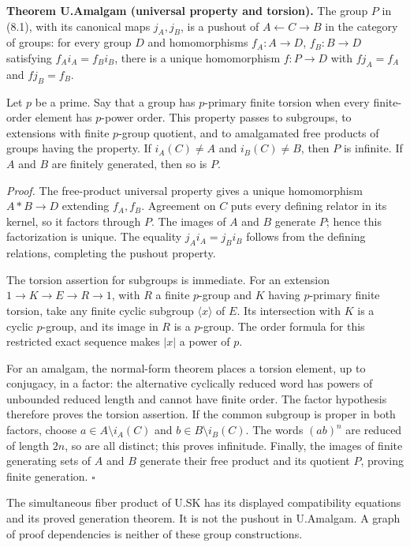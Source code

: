 \documentclass[
  11pt,
  a4paper,
]{article}
\begin{document}
\textbf{Theorem U.Amalgam (universal property and torsion).} The group
\(P\) in (8.1), with its canonical maps \(j_A,j_B\), is a pushout of
\(A\leftarrow C\to B\) in the category of groups: for every group \(D\)
and homomorphisms \(f_A:A\to D\), \(f_B:B\to D\) satisfying
\(f_Ai_A=f_Bi_B\), there is a unique homomorphism \(f:P\to D\) with
\(fj_A=f_A\) and \(fj_B=f_B\).

Let \(p\) be a prime. Say that a group has \(p\)-primary finite torsion
when every finite-order element has \(p\)-power order. This property
passes to subgroups, to extensions with finite \(p\)-group quotient, and
to amalgamated free products of groups having the property. If
\(i_A(C)\ne A\) and \(i_B(C)\ne B\), then \(P\) is infinite. If \(A\)
and \(B\) are finitely generated, then so is \(P\).

\emph{Proof.} The free-product universal property gives a unique
homomorphism \(A*B\to D\) extending \(f_A,f_B\). Agreement on \(C\) puts
every defining relator in its kernel, so it factors through \(P\). The
images of \(A\) and \(B\) generate \(P\); hence this factorization is
unique. The equality \(j_Ai_A=j_Bi_B\) follows from the defining
relations, completing the pushout property.

The torsion assertion for subgroups is immediate. For an extension
\(1\to K\to E\to R\to1\), with \(R\) a finite \(p\)-group and \(K\)
having \(p\)-primary finite torsion, take any finite cyclic subgroup
\(\langle x\rangle\) of \(E\). Its intersection with \(K\) is a cyclic
\(p\)-group, and its image in \(R\) is a \(p\)-group. The order formula
for this restricted exact sequence makes \(|x|\) a power of \(p\).

For an amalgam, the normal-form theorem places a torsion element, up to
conjugacy, in a factor: the alternative cyclically reduced word has
powers of unbounded reduced length and cannot have finite order. The
factor hypothesis therefore proves the torsion assertion. If the common
subgroup is proper in both factors, choose \(a\in A\setminus i_A(C)\)
and \(b\in B\setminus i_B(C)\). The words \((ab)^n\) are reduced of
length \(2n\), so are all distinct; this proves infinitude. Finally, the
images of finite generating sets of \(A\) and \(B\) generate their free
product and its quotient \(P\), proving finite generation. \(\square\)

The simultaneous fiber product of U.SK has its displayed compatibility
equations and its proved generation theorem. It is not the pushout in
U.Amalgam. A graph of proof dependencies is neither of these group
constructions.
\end{document}
